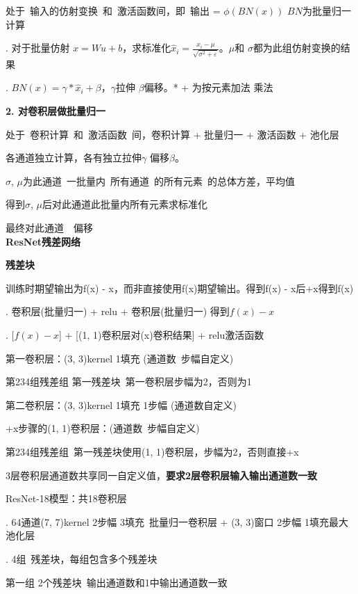 \documentclass[UTF8]{ctexart}
\begin{document}
  \quad 处于\ 输入的仿射变换\ 和\ 激活函数间，即\ 输出 = $\phi (BN(x))$ $BN$为批量归一计算

  . 对于批量仿射 $x = Wu + b$，求标准化$\hat{x}_i = \frac{{x_i} - \mu}{\sqrt{\sigma^2 + \varepsilon }}$。$\mu $和 $\sigma$都为此组仿射变换的结果

  . $BN(x) = \gamma * \hat{x}_i + \beta $，$\gamma$拉伸 $\beta$偏移。* + 为按元素加法 乘法

  \textbf{2. 对卷积层做批量归一}

  \quad 处于\ 卷积计算\ 和\ 激活函数\ 间，卷积计算 + 批量归一 + 激活函数 + 池化层

  \quad 各通道独立计算，各有独立拉伸$\gamma$ 偏移$\beta$。
  
  \quad $\sigma$, $\mu$为此通道\ 一批量内\ 所有通道\ 的所有元素\ 的总体方差，平均值

  \quad 得到$\sigma$, $\mu$后对此通道此批量内所有元素求标准化

  \quad 最终对此通道\ 
  \ 偏移\\
\textbf{ResNet残差网络}

  \textbf{残差块}

  \quad 训练时期望输出为f(x) - x，而非直接使用f(x)期望输出。得到f(x) - x后+x得到f(x)

  . 卷积层(批量归一) + relu + 卷积层(批量归一) 得到$f(x) - x$
  
  . [$f(x) - x$] + [(1, 1)卷积层对(x)卷积结果] + relu激活函数
  
  \quad \quad 第一卷积层：(3, 3)kernel 1填充 (通道数\ 步幅自定义)

  \quad \quad \quad 第234组残差组 第一残差块\ 第一卷积层步幅为2，否则为1

  \quad \quad 第二卷积层：(3, 3)kernel 1填充 1步幅 (通道数自定义)

  \quad \quad +x步骤的(1, 1)卷积层：(通道数\ 步幅自定义) 

  \quad \quad \quad 第234组残差组\ 第一残差块使用(1, 1)卷积层，步幅为2，否则直接+x

  \quad \quad 3层卷积层通道数共享同一自定义值，\textbf{要求2层卷积层输入输出通道数一致}

  ResNet-18模型：共18卷积层

  . 64通道(7, 7)kernel 2步幅 3填充\ 批量归一卷积层 + (3, 3)窗口 2步幅 1填充最大池化层

  . 4组\ 残差块，每组包含多个残差块

  \quad \quad 第一组 2个残差块\ 输出通道数和1中输出通道数一致
  
\end{document}
